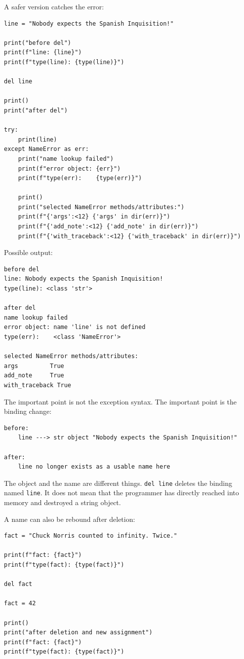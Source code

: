 A safer version catches the error:

\begin{verbatim}
line = "Nobody expects the Spanish Inquisition!"

print("before del")
print(f"line: {line}")
print(f"type(line): {type(line)}")

del line

print()
print("after del")

try:
    print(line)
except NameError as err:
    print("name lookup failed")
    print(f"error object: {err}")
    print(f"type(err):    {type(err)}")

    print()
    print("selected NameError methods/attributes:")
    print(f"{'args':<12} {'args' in dir(err)}")
    print(f"{'add_note':<12} {'add_note' in dir(err)}")
    print(f"{'with_traceback':<12} {'with_traceback' in dir(err)}")
\end{verbatim}

Possible output:

\begin{verbatim}
before del
line: Nobody expects the Spanish Inquisition!
type(line): <class 'str'>

after del
name lookup failed
error object: name 'line' is not defined
type(err):    <class 'NameError'>

selected NameError methods/attributes:
args         True
add_note     True
with_traceback True
\end{verbatim}

The important point is not the exception syntax. The important point is the binding change:

\begin{verbatim}
before:
    line ---> str object "Nobody expects the Spanish Inquisition!"

after:
    line no longer exists as a usable name here
\end{verbatim}

The object and the name are different things. \texttt{del line} deletes the binding named \texttt{line}. It does not mean that the programmer has directly reached into memory and destroyed a string object.

A name can also be rebound after deletion:

\begin{verbatim}
fact = "Chuck Norris counted to infinity. Twice."

print(f"fact: {fact}")
print(f"type(fact): {type(fact)}")

del fact

fact = 42

print()
print("after deletion and new assignment")
print(f"fact: {fact}")
print(f"type(fact): {type(fact)}")
\end{verbatim}

